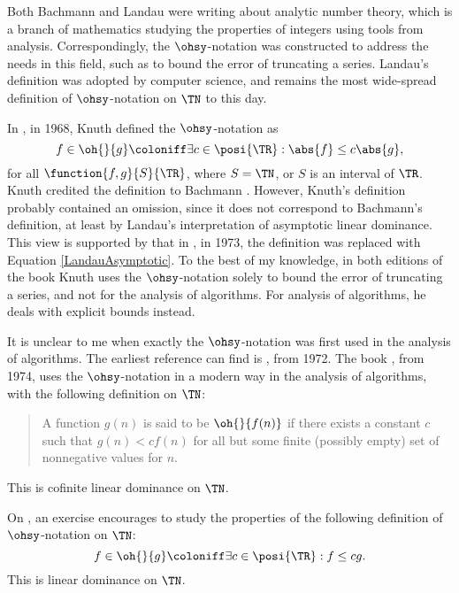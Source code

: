 \documentclass[b5paper, english, oneside]{memoir}
\begin{document}
Both Bachmann and Landau were writing about analytic number theory, which is a branch of mathematics studying the properties of integers using tools from analysis. Correspondingly, the $\ohsy$-notation was constructed to address the needs in this field, such as to bound the error of truncating a series. Landau's definition was adopted by computer science, and remains the most wide-spread definition of $\ohsy$-notation on $\TN$ to this day.

In \cite{ArtOfProgrammingVol1Ed1}, in 1968, Knuth defined the $\ohsy$-notation as
\begin{equation}
f \in \oh{}{g} \coloniff \exists c \in \posi{\TR}: \abs{f} \leq c \abs{g},
\end{equation}
for all $\function{f, g}{S}{\TR}$, where $S = \TN$, or $S$ is an interval of $\TR$. Knuth credited the definition to Bachmann \cite{BachmannOh}. However, Knuth's definition probably contained an omission, since it does not correspond to Bachmann's definition, at least by Landau's interpretation of asymptotic linear dominance. This view is supported by that in \cite{ArtOfProgrammingVol1Ed2}, in 1973, the definition was replaced with Equation \ref{LandauAsymptotic}. To the best of my knowledge, in both editions of the book Knuth uses the $\ohsy$-notation solely to bound the error of truncating a series, and not for the analysis of algorithms. For analysis of algorithms, he deals with explicit bounds instead.



It is unclear to me when exactly the $\ohsy$-notation was first used in the analysis of algorithms. The earliest reference \we{} can find is \cite{EarlyONotation}, from 1972. The book \cite{DesignAndAnalysisOfComputerAlgorithms}, from 1974, uses the $\ohsy$-notation in a modern way in the analysis of algorithms, with the following definition on $\TN$:
\begin{quotation}
A function $g(n)$ is said to be $\oh{}{f(n)}$ if there exists a constant $c$ such that $g(n) < c f(n)$ for all but some finite (possibly empty) set of nonnegative values for $n$.
\end{quotation}
This is cofinite linear dominance on $\TN$. 

On \cite[page 39]{DesignAndAnalysisOfComputerAlgorithms}, an exercise encourages to study the properties of the following definition of $\ohsy$-notation on $\TN$:
\begin{equation}
f \in \oh{}{g} \coloniff \exists c \in \posi{\TR}: f \leq c g.
\end{equation}
This is linear dominance on $\TN$. 
\end{document}
